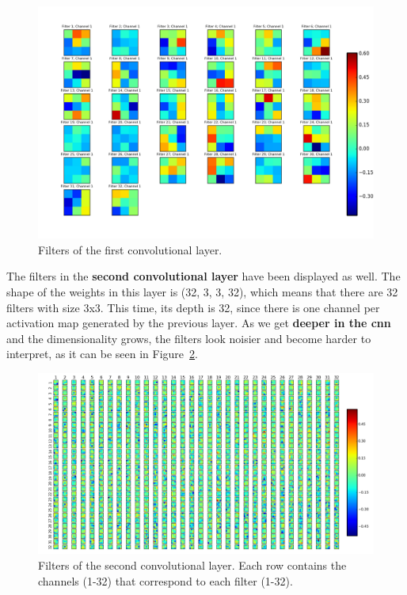 \begin{figure}
	\centering
	\includegraphics[width=0.85\linewidth, keepaspectratio]{figures/weights_conv2d_1.png}
	\caption{Filters of the first convolutional layer.}
	\label{fig:filters}
\end{figure}

The filters in the \textbf{second convolutional layer} have been displayed as well. The shape of the weights in this layer is (32, 3, 3, 32), which means that there are 32 filters with size 3x3. This time, its depth is 32, since there is one channel per activation map generated by the previous layer. As we get \textbf{deeper in the \gls{cnn}} and the dimensionality grows, the filters look noisier and become harder to interpret, as it can be seen in Figure~\ref{fig:filters2}.
\begin{figure}
	\centering
	\includegraphics[width=1\linewidth, keepaspectratio]{figures/weights_conv2d_2.png}
	\caption[Filters of the second convolutional layer.]{Filters of the second convolutional layer. Each row contains the channels (1-32) that correspond to each filter (1-32).}
	\label{fig:filters2}
\end{figure}

